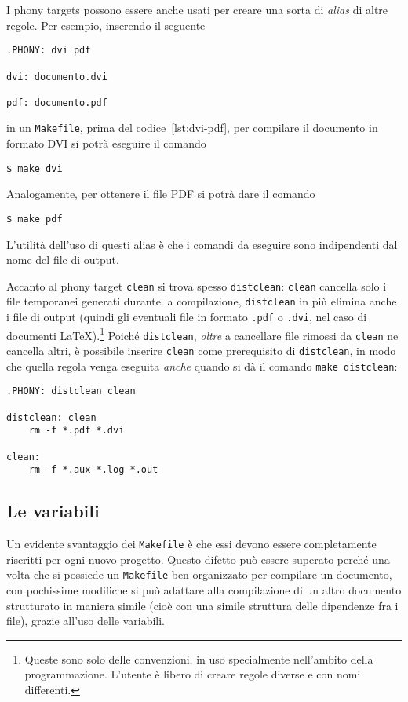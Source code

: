 I phony targets possono essere anche usati per creare una sorta di \emph{alias}
di altre regole.  Per esempio, inserendo il seguente
\begin{lstlisting}[caption={I prerequisiti della regola dell'obiettivo
\texttt{.PHONY} sono i nomi dei phony targets che vengono successivamente
specificati.},label=lst:phony]
.PHONY: dvi pdf

dvi: documento.dvi

pdf: documento.pdf
\end{lstlisting}
in un \texttt{Makefile}, prima del codice~\ref{lst:dvi-pdf}, per compilare il
documento in formato \textsc{DVI} si potrà eseguire il comando
\begin{verbatim}
$ make dvi
\end{verbatim} %
Analogamente, per ottenere il file \textsc{PDF} si potrà dare il comando
\begin{verbatim}
$ make pdf
\end{verbatim} %
L'utilità dell'uso di questi alias è che i comandi da eseguire sono indipendenti
dal nome del file di output.

Accanto al phony target \texttt{clean} si trova spesso \texttt{distclean}:
\texttt{clean} cancella solo i file temporanei generati durante la compilazione,
\texttt{distclean} in più elimina anche i file di output (quindi gli eventuali
file in formato \texttt{.pdf} o \texttt{.dvi}, nel caso di documenti
\LaTeX).\footnote{Queste sono solo delle convenzioni, in uso specialmente
  nell'ambito della programmazione.  L'utente è libero di creare regole diverse
  e con nomi differenti.}
Poiché \texttt{distclean}, \emph{oltre} a cancellare file rimossi da
\texttt{clean} ne cancella altri, è possibile inserire \texttt{clean} come
prerequisito di \texttt{distclean}, in modo che quella regola venga eseguita
\emph{anche} quando si dà il comando \texttt{make distclean}:
\begin{lstlisting}[caption={Phony targets \texttt{distclean} e \texttt{clean}.},
label=lst:distclean]
.PHONY: distclean clean

distclean: clean
	rm -f *.pdf *.dvi

clean:
	rm -f *.aux *.log *.out
\end{lstlisting}


\subsection{Le variabili}
\label{sec:variabili}

Un evidente svantaggio dei \texttt{Makefile} è che essi devono essere
completamente riscritti per ogni nuovo progetto.  Questo difetto può essere
superato perché una volta che si possiede un \texttt{Makefile} ben organizzato
per compilare un documento, con pochissime modifiche si può adattare alla
compilazione di un altro documento strutturato in maniera simile (cioè con una
simile struttura delle dipendenze fra i file), grazie all'uso delle variabili.

